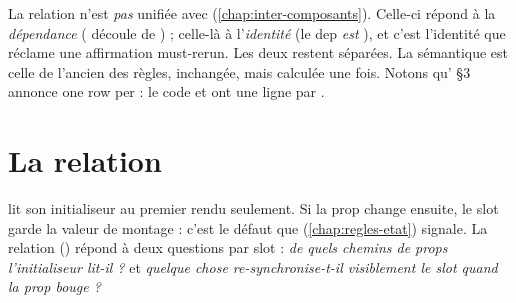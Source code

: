 \begin{decision}
La relation n'est \emph{pas} unifiée avec  (\cref{chap:inter-composants}). Celle-ci répond à la \emph{dépendance} ( découle de ) ; celle-là à l'\emph{identité} (le dep \emph{est} ), et c'est l'identité que réclame une affirmation must-rerun. Les deux restent séparées. La sémantique est celle de l'ancien  des règles, inchangée, mais calculée une fois. Notons qu' §3 annonce \og one row per \fg{} : le code et  ont une ligne par .
\end{decision}

\section{La relation }
\label{sec:relations-seeds}
 lit son initialiseur au premier rendu seulement. Si la prop change ensuite, le slot garde la valeur de montage : c'est le défaut que  (\cref{chap:regles-etat}) signale. La relation  () répond à deux questions par slot : \emph{de quels chemins de props l'initialiseur lit-il ?} et \emph{quelque chose re-synchronise-t-il visiblement le slot quand la prop bouge ?}

